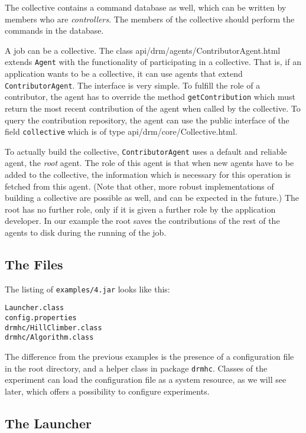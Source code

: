 \documentclass{article}
\begin{document}
The collective contains a command database as well, which can be written by
members who are {\em controllers}.
The members of the collective should perform the commands in the database.

A job can be a collective.
The class
{api/drm/agents/ContributorAgent.html} extends
{\tt Agent} with the functionality of participating in a collective.
That is, if an application wants to be a collective, it can use
agents that extend {\tt ContributorAgent}.
The interface is very simple.
To fulfill the role of a contributor, the agent has to override the method
{\tt getContribution} which must return the most recent contribution
of the agent when called by the collective.
To query the contribution repository, the agent can use the public
interface of the field {\tt collective} which is of type
{api/drm/core/Collective.html}.

To actually build the collective, {\tt ContributorAgent} uses a default
and reliable agent, the {\em root} agent.
The role of this agent is that when new agents have to be added to the
collective, the information which is necessary for this operation is
fetched from this agent.
(Note that other, more robust implementations of building a collective
are possible as well, and can be expected in the future.)
The root has no further role, only if it is given a further role by the
application developer.
In our example the root saves the contributions of the rest of the agents
to disk during the running of the job.

\subsection{The Files}

The listing of {\tt examples/4.jar} looks like this:
\begin{verbatim}
Launcher.class
config.properties
drmhc/HillClimber.class
drmhc/Algorithm.class
\end{verbatim}
The difference from the previous examples is the presence of a
configuration file in the root directory,
and a helper class in package {\tt drmhc}.
Classes of the experiment can load the configuration file as a system resource,
as we will see later, which offers a possibility to configure experiments.

\subsection{The Launcher}
\end{document}
